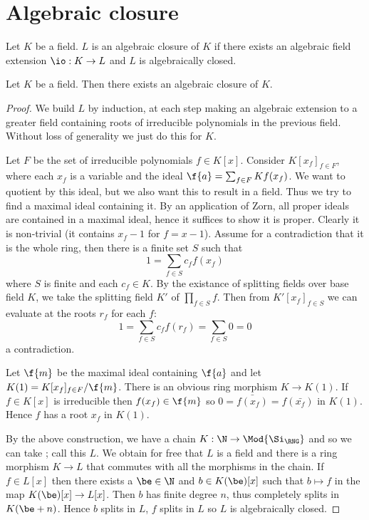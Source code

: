 \section{Algebraic closure}
\begin{dfn}
    Let $K$ be a field.
    $L$ is an algebraic closure of $K$ 
    if there exists an algebraic field extension 
    $\io : K \to L$ and $L$ is algebraically closed.
\end{dfn}

\begin{prop}
    Let $K$ be a field. 
    Then there exists an algebraic closure of $K$.
\end{prop}
\begin{proof}
    We build $L$ by induction, 
    at each step making an algebraic extension to a greater field
    containing roots of irreducible polynomials in the previous field.
    Without loss of generality we just do this for $K$.

    Let $F$ be the set of irreducible polynomials $f \in K[x]$.
    Consider $K[x_f]_{f \in F}$, 
    where each $x_f$ is a variable and the ideal 
    $\f{a} = \sum_{f \in F} K f(x_f) $.
    We want to quotient by this ideal,
    but we also want this to result in a field.
    Thus we try to find a maximal ideal containing it.
    By an application of Zorn, all proper ideals are 
    contained in a maximal ideal, 
    hence it suffices to show it is proper.
    Clearly it is non-trivial 
    (it contains $x_f - 1$ for $f = x - 1$).
    Assume for a contradiction that it is the whole ring,
    then there is a finite set $S$ such that
    \[1 = \sum_{f \in S} c_f f(x_f)\]
    where $S$ is finite and each $c_f \in K$.
    By the existance of splitting fields over base field $K$, 
    we take the splitting field $K'$ of $\prod_{f \in S} f$.
    Then from $K'[x_f]_{f \in S}$ 
    we can evaluate at the roots $r_f$ for each $f$:
    \[1 = \sum_{f \in S} c_f f(r_f) = \sum_{f \in S} 0 = 0\]
    a contradiction.

    Let $\f{m}$ be the maximal ideal containing $\f{a}$ and let 
    $K(1) = K[x_f]_{f \in F} / \f{m}$.
    There is an obvious ring morphism $K \to K(1)$. 
    If $f \in K[x]$ is irreducible then $f(x_f) \in \f{m}$ so
    $0 = \bar{f(x_f)} = f(\bar{x_f})$ in $K(1)$.
    Hence $f$ has a root $x_f$ in $K(1)$.

    By the above construction, 
    we have a chain $K : \N \to \Mod{\Si_\RNG}$ and so we can take 
    ; 
    call this $L$.
    We obtain for free that $L$ is a field and there is a ring morphism 
    $K \to L$ that commutes with all the morphisms in the chain.
    If $f \in L[x]$ then there exists a $\be \in \N$ and 
    $b \in K(\be)[x]$ such that $b \mapsto f$ 
    in the map $K(\be)[x] \to L[x]$.
    Then $b$ has finite degree $n$, 
    thus completely splits in $K(\be + n)$.
    Hence $b$ splits in $L$, 
    $f$ splits in $L$ so $L$ is algebraically closed.


\end{proof}

